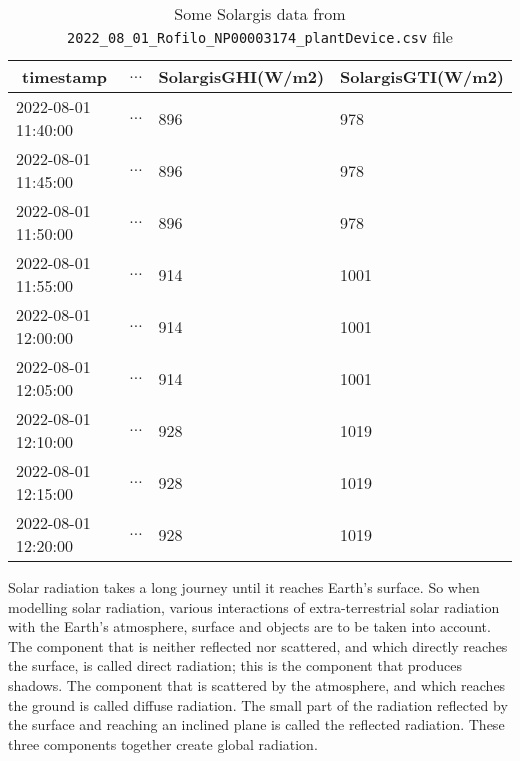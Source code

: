 \begin{table}[H]
	\begin{center}
		\begin{tabular}[c]{l|l|l|l}
			\hline
			\multicolumn{1}{c|}{\textbf{timestamp}}         &
			\multicolumn{1}{c|}{\textbf{$\ldots$}}          &
			\multicolumn{1}{c|}{\textbf{SolargisGHI(W/m2)}} &
			\multicolumn{1}{c}{\textbf{SolargisGTI(W/m2)}}                          \\
			\hline
			2022-08-01 11:40:00                             & $\ldots$ & 896 & 978  \\
			2022-08-01 11:45:00                             & $\ldots$ & 896 & 978  \\
			2022-08-01 11:50:00                             & $\ldots$ & 896 & 978  \\
			2022-08-01 11:55:00                             & $\ldots$ & 914 & 1001 \\
			2022-08-01 12:00:00                             & $\ldots$ & 914 & 1001 \\
			2022-08-01 12:05:00                             & $\ldots$ & 914 & 1001 \\
			2022-08-01 12:10:00                             & $\ldots$ & 928 & 1019 \\
			2022-08-01 12:15:00                             & $\ldots$ & 928 & 1019 \\
			2022-08-01 12:20:00                             & $\ldots$ & 928 & 1019 \\

			\hline
		\end{tabular}
		\caption{Some Solargis data from \texttt{2022\_08\_01\_Rofilo\_NP00003174\_plantDevice.csv} file}\label{tab:solargis}
	\end{center}
\end{table}


Solar radiation takes a long journey until it reaches Earth’s surface. So when
modelling solar radiation, various interactions of extra-terrestrial solar
radiation with the Earth’s atmosphere, surface and objects are to be taken into
account. The component that is neither reflected nor scattered, and which
directly
reaches the surface, is called direct radiation; this is the component that
produces shadows. The component that is scattered by the atmosphere, and which
reaches the ground is called diffuse radiation. The small part of the radiation
reflected by the surface and reaching an inclined plane is called the reflected
radiation. These three components together create global radiation.

